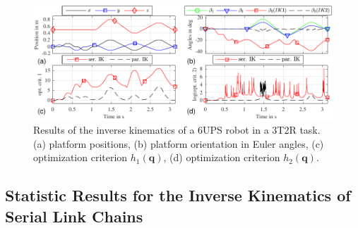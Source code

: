 \documentclass[robotics,article,submit,moreauthors,pdftex]{Definitions/mdpi}
\newcommand{\bm}[1]{\boldsymbol{#1}}
\begin{document}
%
\begin{figure}[tb]
	\includegraphics{parrob_traj_results1.pdf}
	\caption{Results of the inverse kinematics of a 6UPS robot in a 3T2R task. (a) platform positions, (b) platform orientation in Euler angles, (c) optimization criterion $h_1(\bm{{q}})$, (d) optimization criterion $h_2(\bm{{q}})$.}
	\label{fig:parrob_traj_3T2R}
\end{figure} 


\subsection{Statistic Results for the Inverse Kinematics of Serial Link Chains}
\label{sec:Ergebnisse_IK_Statistik}
\end{document}
